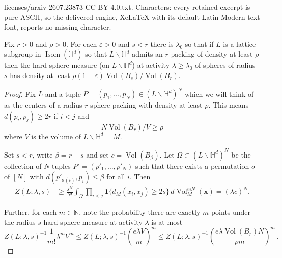 \documentclass[10pt,a4paper]{amsart}
\newcommand{\Isom}{\operatorname{Isom}}
\newcommand{\Vol}{\operatorname{Vol}}
\newcommand{\eps}{\varepsilon}
\newcommand{\one}{\mathbf{1}}
\newcommand{\s}{\sigma}
\renewcommand{\H}{\mathbb{H}}
\begin{document}
licenses/arxiv-2607.23873-CC-BY-4.0.txt. Characters: every retained excerpt is pure ASCII, so the delivered engine, XeLaTeX with its default Latin Modern text font, reports no missing character.
\begin{lemma}\label{lem:packing-to-gibbs}
    Fix $r > 0$ and $\rho > 0$.  For each $\eps > 0$ and $s < r$ there is $\lambda_0$  so that if $L$ is a lattice subgroup in $\Isom(\H^d)$ so that $L \backslash \H^d$ admits an $r$-packing of density at least $\rho$ then the hard-sphere measure (on $L \backslash \H^d$) at activity $\lambda \geq \lambda_0$ of spheres of radius $s$ has density at least $\rho (1-\eps)\Vol(B_s)/\Vol(B_r)$.
\end{lemma}

\begin{proof}
    Fix $L$ and a tuple $P=(p_1,\ldots, p_N) \in (L \backslash \H^d)^N$ which we will think of as the centers of a radius-$r$ sphere packing with density at least $\rho$. This means $d(p_i,p_j) \ge 2r$ if $i<j$ and 
    $$N \Vol(B_r)/V\ge \rho$$
    where $V$ is the volume of $L \backslash \H^d=M$. 
    
    Set $s < r$, write $\beta = r - s$ and set $c = \Vol(B_\beta)$.  Let $\Omega \subset (L \backslash \H^d)^N$ be the collection of $N$-tuples $P'=(p'_1,\ldots, p'_N)$ such that there exists a permutation $\s$ of $[N]$ with $d(p'_{\s(i)},p_i) \le \beta$ for all $i$.  Then
    \begin{align*}
        Z(L;\lambda,s) 
        &\ge \frac{\lambda^N}{N!} \int_{\Omega} \prod_{i < j} \one\{d_M(x_i,x_j) \geq 2s\} \,d\Vol_M^{\otimes N}(\mathbf{x}) = (\lambda c)^N. 
    \end{align*}   
    


 

    Further, for each $m\in \mathbb{N}$, note the probability there are exactly $m$ points under the radius-$s$ hard-sphere measure at activity $\lambda$ is at most
    $$Z(L;\lambda,s)^{-1}\frac{1}{m!}\lambda^m V^m \leq Z(L;\lambda,s)^{-1}\left(\frac{e \lambda V}{m} \right)^m \leq Z(L;\lambda,s)^{-1}\left(\frac{e \lambda \Vol(B_r)  N}{\rho m} \right)^m\,. $$


\end{proof}
\end{document}
